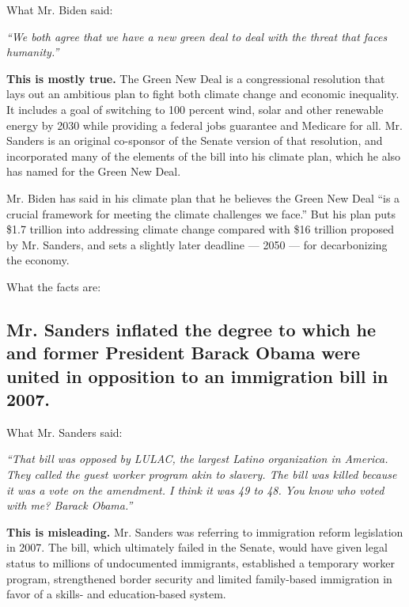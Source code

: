 What Mr. Biden said:

\emph{``We both agree that we have a new green deal to deal with the
threat that faces humanity.''}

\textbf{This is mostly true.} The Green New Deal is a congressional
resolution that lays out an ambitious plan to fight both climate change
and economic inequality. It includes a goal of switching to 100 percent
wind, solar and other renewable energy by 2030 while providing a federal
jobs guarantee and Medicare for all. Mr. Sanders is an original
co-sponsor of the Senate version of that resolution, and incorporated
many of the elements of the bill into his climate plan, which he also
has named for the Green New Deal.

Mr. Biden has said in his climate plan that he believes the Green New
Deal ``is a crucial framework for meeting the climate challenges we
face.'' But his plan puts \$1.7 trillion into addressing climate change
compared with \$16 trillion proposed by Mr. Sanders, and sets a slightly
later deadline --- 2050 --- for decarbonizing the economy.

What the facts are:

\hypertarget{mr-sanders-inflated-the-degree-to-which-he-and-former-president-barack-obama-were-united-in-opposition-to-an-immigration-bill-in-2007}{%
\subsection{Mr. Sanders inflated the degree to which he and former
President Barack Obama were united in opposition to an immigration bill
in
2007.}\label{mr-sanders-inflated-the-degree-to-which-he-and-former-president-barack-obama-were-united-in-opposition-to-an-immigration-bill-in-2007}}

What Mr. Sanders said:

\emph{``That bill was opposed by LULAC, the largest Latino organization
in America. They called the guest worker program akin to slavery. The
bill was killed because it was a vote on the amendment. I think it was
49 to 48. You know who voted with me? Barack Obama.''}

\textbf{This is misleading.} Mr. Sanders was referring to immigration
reform legislation in 2007. The bill, which ultimately failed in the
Senate, would have given legal status to millions of undocumented
immigrants, established a temporary worker program, strengthened border
security and limited family-based immigration in favor of a skills- and
education-based system.

